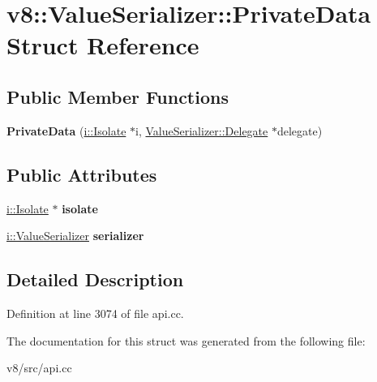 \hypertarget{structv8_1_1ValueSerializer_1_1PrivateData}{}\section{v8\+:\+:Value\+Serializer\+:\+:Private\+Data Struct Reference}
\label{structv8_1_1ValueSerializer_1_1PrivateData}
\subsection*{Public Member Functions}
\begin{DoxyCompactItemize}
\item 
\mbox{\label{structv8_1_1ValueSerializer_1_1PrivateData_a9d29dd06709b46c7d8102c9c1782c807}} 
{\bfseries Private\+Data} (\mbox{\hyperlink{classv8_1_1internal_1_1Isolate}{i\+::\+Isolate}} $\ast$i, \mbox{\hyperlink{classv8_1_1ValueSerializer_1_1Delegate}{Value\+Serializer\+::\+Delegate}} $\ast$delegate)
\end{DoxyCompactItemize}
\subsection*{Public Attributes}
\begin{DoxyCompactItemize}
\item 
\mbox{\label{structv8_1_1ValueSerializer_1_1PrivateData_a6288bd897847fd46508422dd9400caf2}} 
\mbox{\hyperlink{classv8_1_1internal_1_1Isolate}{i\+::\+Isolate}} $\ast$ {\bfseries isolate}
\item 
\mbox{\label{structv8_1_1ValueSerializer_1_1PrivateData_a3d757ca19044f71f173e99058dab760d}} 
\mbox{\hyperlink{classv8_1_1internal_1_1ValueSerializer}{i\+::\+Value\+Serializer}} {\bfseries serializer}
\end{DoxyCompactItemize}


\subsection{Detailed Description}


Definition at line 3074 of file api.\+cc.



The documentation for this struct was generated from the following file\+:\begin{DoxyCompactItemize}
\item 
v8/src/api.\+cc\end{DoxyCompactItemize}

